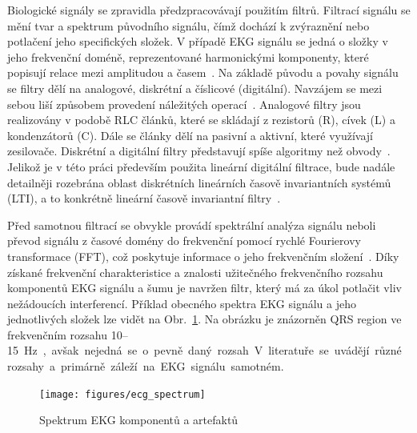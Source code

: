 Biologické signály se zpravidla předzpracovávají použitím filtrů. Filtrací
signálu se mění tvar a spektrum původního signálu, čímž dochází k zvýraznění nebo
potlačení jeho specifických složek. V případě EKG signálu se jedná o složky v
jeho frekvenční doméně, reprezentované harmonickými komponenty, které popisují
relace mezi amplitudou a časem~\cite{Jan2002}. Na základě původu a povahy
signálu se filtry dělí na analogové, diskrétní a číslicové (digitální). Navzájem
se mezi sebou liší způsobem provedení náležitých operací~\cite{Skop1994}.
Analogové filtry jsou realizovány v podobě RLC článků, které se skládají z
rezistorů (R), cívek (L) a kondenzátorů (C). Dále se články dělí na pasivní a
aktivní, které využívají zesilovače. Diskrétní a digitální filtry představují
spíše algoritmy než obvody~\cite{Prchal2000}. Jelikož je v této práci především
použita lineární digitální filtrace, bude nadále detailněji rozebrána oblast
diskrétních lineárních časově invariantních systémů (LTI), a to konkrétně
lineární časově invariantní filtry~\cite{Jan2002}.

Před samotnou filtrací se obvykle provádí spektrální analýza signálu neboli
převod signálu z časové domény do frekvenční pomocí rychlé Fourierovy transformace
(FFT), což poskytuje informace o jeho frekvenčním složení~\cite{Prchal2000}.
Díky získané frekvenční charakteristice a znalosti užitečného frekvenčního
rozsahu komponentů EKG signálu a šumu je navržen filtr, který má za úkol
potlačit vliv nežádoucích interferencí. Příklad obecného spektra EKG signálu a
jeho jednotlivých složek lze vidět na Obr.~\ref{fig:ecg_spectrum}. Na obrázku je
znázorněn QRS region ve frekvenčním rozsahu 10--15~\si\Hz,~avšak nejedná se o
pevně daný rozsah. V literatuře se uvádějí různé rozsahy a primárně záleží na
EKG signálu samotném.

\begin{figure}[h]
	\begin{center}
		\texttt{[image: figures/ecg\_spectrum]}
		\caption{Spektrum EKG komponentů a artefaktů}
		\label{fig:ecg_spectrum}
	\end{center}
\end{figure}

